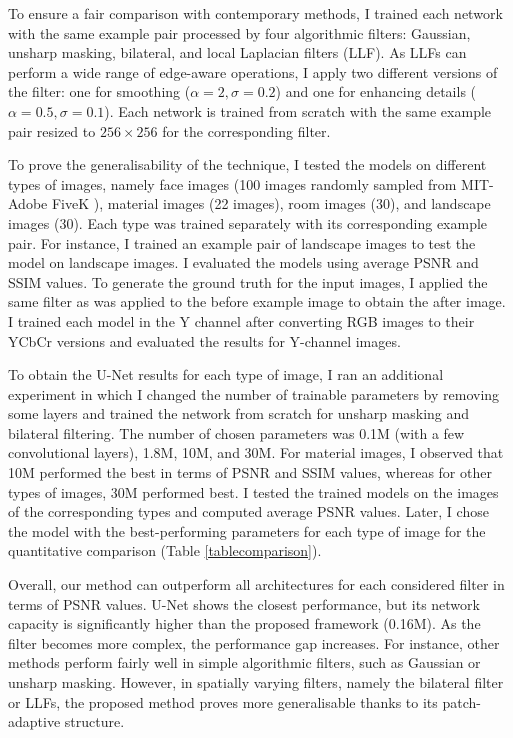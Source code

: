 To ensure a fair comparison with contemporary methods, I trained each network with the same example pair processed by four algorithmic filters: Gaussian, unsharp masking, bilateral, and local Laplacian filters (\gls{LLF}). As LLFs can perform a wide range of edge-aware operations, I apply two different versions of the filter: one for smoothing ($\alpha=2, \sigma=0.2$) and one for enhancing details ($\alpha=0.5, \sigma=0.1$). Each network is trained from scratch with the same example pair resized to $256 \times 256$ for the corresponding filter.

To prove the generalisability of the technique, I tested the models on different types of images, namely face images (100 images randomly sampled from MIT-Adobe FiveK \cite{Bychkovsky11Learning}), material images (22 images), room images (30), and landscape images (30). Each type was trained separately with its corresponding example pair. For instance, I trained an example pair of landscape images to test the model on landscape images. I evaluated the models using average PSNR and SSIM values. To generate the ground truth for the input images, I applied the same filter as was applied to the before example image to obtain the after image. I trained each model in the Y channel after converting RGB images to their YCbCr versions and evaluated the results for Y-channel images.

To obtain the U-Net results for each type of image, I ran an additional experiment in which I changed the number of trainable parameters by removing some layers and trained the network from scratch for unsharp masking and bilateral filtering. The number of chosen parameters was 0.1M (with a few convolutional layers), 1.8M, 10M, and 30M. For material images, I observed that 10M performed the best in terms of PSNR and SSIM values, whereas for other types of images, 30M performed best. I tested the trained models on the images of the corresponding types and computed average PSNR values. Later, I chose the model with the best-performing parameters for each type of image for the quantitative comparison (Table \ref{tablecomparison}).

Overall, our method can outperform all architectures for each considered filter in terms of PSNR values. U-Net shows the closest performance, but its network capacity is significantly higher than the proposed framework (0.16M). As the filter becomes more complex, the performance gap increases. For instance, other methods perform fairly well in simple algorithmic filters, such as Gaussian or unsharp masking. However, in spatially varying filters, namely the bilateral filter or LLFs, the proposed method proves more generalisable thanks to its patch-adaptive structure.

